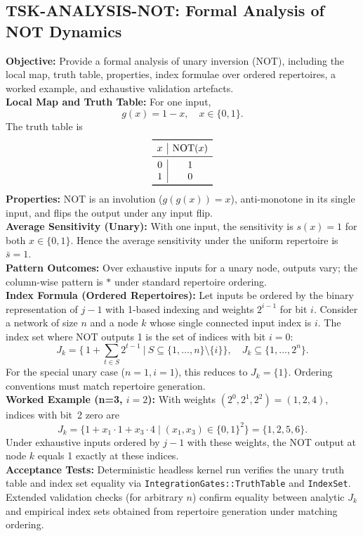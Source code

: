 \documentclass{article}
\begin{document}
\subsection{TSK-ANALYSIS-NOT: Formal Analysis of NOT Dynamics}
\textbf{Objective:} Provide a formal analysis of unary inversion (NOT), including the local map, truth table, properties, index formulae over ordered repertoires, a worked example, and exhaustive validation artefacts.\\
\textbf{Local Map and Truth Table:} For one input,
\[
g(x) = 1 - x,\quad x\in\{0,1\}.
\]
The truth table is
\[
\begin{array}{c|c}
\toprule
 x & \mathrm{NOT}(x) \\
\midrule
 0 & 1 \\
 1 & 0 \\
\bottomrule
\end{array}
\]
\textbf{Properties:} NOT is an involution (\(g(g(x))=x\)), anti-monotone in its single input, and flips the output under any input flip.\\
\textbf{Average Sensitivity (Unary):} With one input, the sensitivity is \(s(x)=1\) for both \(x\in\{0,1\}\). Hence the average sensitivity under the uniform repertoire is \(\bar{s}=1\).\\
\textbf{Pattern Outcomes:} Over exhaustive inputs for a unary node, outputs vary; the column-wise pattern is \(*\) under standard repertoire ordering.\\
\textbf{Index Formula (Ordered Repertoires):} Let inputs be ordered by the binary representation of \(j-1\) with 1-based indexing and weights \(2^{i-1}\) for bit \(i\). Consider a network of size \(n\) and a node \(k\) whose single connected input index is \(i\). The index set where \(\mathrm{NOT}\) outputs 1 is the set of indices with bit \(i=0\):
\[
J_k = \Big\{\, 1 + \sum_{t\in S} 2^{t-1} \ \Big| \ S \subseteq \{1,\dots,n\}\setminus\{i\} \Big\},\quad J_k \subseteq \{1,\dots,2^n\}.
\]
For the special unary case (\(n=1, i=1\)), this reduces to \(J_k=\{1\}\). Ordering conventions must match repertoire generation.\\
\textbf{Worked Example (n=3, \(i=2\)):} With weights \((2^{0},2^{1},2^{2})=(1,2,4)\), indices with bit~2 zero are
\[
J_k = \{1 + x_1\cdot 1 + x_3\cdot 4\mid (x_1,x_3)\in\{0,1\}^2\} = \{1,2,5,6\}.
\]
Under exhaustive inputs ordered by \(j-1\) with these weights, the NOT output at node \(k\) equals 1 exactly at these indices.\\
\textbf{Acceptance Tests:} Deterministic headless kernel run verifies the unary truth table and index set equality via \texttt{Integration\textasciigrave Gates::TruthTable} and \texttt{IndexSet}. Extended validation checks (for arbitrary \(n\)) confirm equality between analytic \(J_k\) and empirical index sets obtained from repertoire generation under matching ordering.\\
\end{document}
